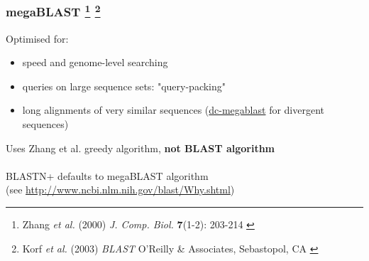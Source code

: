%
\begin{frame}
  \frametitle{megaBLAST
  \footnote{\tiny{Zhang \textit{et al.} (2000) \textit{J. Comp. Biol.} \textbf{7}(1-2): 203-214
}}
  \footnote{\tiny{Korf \textit{et al.} (2003) \textit{BLAST} O'Reilly \& Associates, Sebastopol, CA
}}
  }
  Optimised for:
  \begin{itemize}
    \item \textcolor{hutton_green}{speed and genome-level searching}
    \item \textcolor{hutton_blue}{queries on large sequence sets}: "query-packing"
    \item \textcolor{hutton_purple}{long alignments of very similar sequences} (\url{dc-megablast} for divergent sequences)
  \end{itemize}
  Uses Zhang et al. greedy algorithm, \textbf{not BLAST algorithm} \\~\\
  \textcolor{RawSienna}{BLASTN+ defaults to megaBLAST algorithm} \\
  (see \href{http://www.ncbi.nlm.nih.gov/blast/Why.shtml}{http://www.ncbi.nlm.nih.gov/blast/Why.shtml})
\end{frame}


